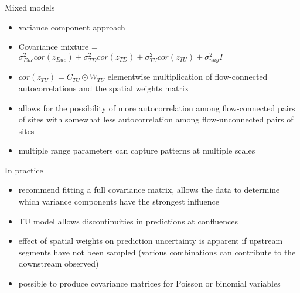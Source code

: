 \documentclass[12pt]{amsart}
\begin{document}
Mixed models
\begin{itemize}
\item variance component approach
\item Covariance mixture = $\sigma^2_{Euc}cor(z_{Euc})+\sigma^2_{TD}cor(z_{TD})+\sigma^2_{TU}cor(z_{TU})+\sigma^2_{nug}I$
\item $cor(z_{TU})= C_{TU} \odot W_{TU}$ elementwise multiplication of flow-connected autocorrelations and the spatial weights matrix 
\item allows for the possibility of more autocorrelation among flow-connected pairs of sites with somewhat less autocorrelation among flow-unconnected pairs of sites
\item multiple range parameters can capture patterns at multiple scales
\end{itemize}

In practice
\begin{itemize}
\item recommend fitting a full covariance matrix, allows the data to determine which variance components have the strongest influence
\item TU model allows discontinuities in predictions at confluences
\item effect of spatial weights on prediction uncertainty is apparent if upstream segments have not been sampled (various combinations can contribute to the downstream observed)
\item possible to produce covariance matrices for Poisson or binomial variables
\end{itemize}

\subsection{}
\end{document}
